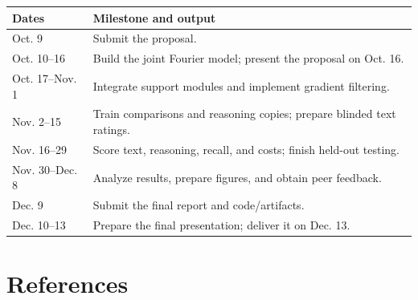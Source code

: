 \documentclass[11pt,letterpaper]{article}
\begin{document}
\smallskip\begin{tabularx}{\textwidth}{@{}p{3.2cm}X@{}}\toprule
\textbf{Dates} & \textbf{Milestone and output}\\\midrule
Oct. 9 & Submit the proposal.\\
Oct. 10–16 & Build the joint Fourier model; present the proposal on Oct. 16.\\
Oct. 17–Nov. 1 & Integrate support modules and implement gradient filtering.\\
Nov. 2–15 & Train comparisons and reasoning copies; prepare blinded text ratings.\\
Nov. 16–29 & Score text, reasoning, recall, and costs; finish held-out testing.\\
Nov. 30–Dec. 8 & Analyze results, prepare figures, and obtain peer feedback.\\
Dec. 9 & Submit the final report and code/artifacts.\\
Dec. 10–13 & Prepare the final presentation; deliver it on Dec. 13.\\
\bottomrule\end{tabularx}\smallskip

\newpage
\section*{References}
\end{document}
